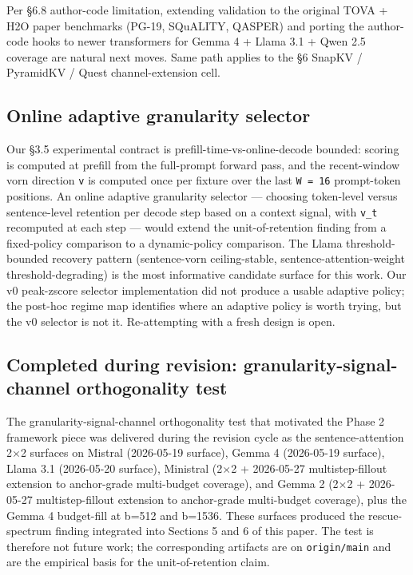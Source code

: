 \documentclass[10pt]{article}
\begin{document}
Per \S{}6.8 author-code limitation, extending validation to the original
TOVA + H2O paper benchmarks (PG-19, SQuALITY, QASPER) and porting the
author-code hooks to newer transformers for Gemma 4 + Llama 3.1 + Qwen
2.5 coverage are natural next moves. Same path applies to the \S{}6
SnapKV / PyramidKV / Quest channel-extension cell.

\subsection{Online adaptive granularity selector}\label{84-online-adaptive-granularity-selector}

Our \S{}3.5 experimental contract is prefill-time-vs-online-decode bounded:
scoring is computed at prefill from the full-prompt forward pass, and
the recent-window vorn direction \texttt{v} is computed once per fixture
over the last \texttt{W\ =\ 16} prompt-token positions. An online
adaptive granularity selector --- choosing token-level versus
sentence-level retention per decode step based on a context signal, with
\texttt{v\_t} recomputed at each step --- would extend the
unit-of-retention finding from a fixed-policy comparison to a
dynamic-policy comparison. The Llama threshold-bounded recovery pattern
(sentence-vorn ceiling-stable, sentence-attention-weight
threshold-degrading) is the most informative candidate surface for this
work. Our v0 peak-zscore selector implementation did not produce a
usable adaptive policy; the post-hoc regime map identifies where an
adaptive policy is worth trying, but the v0 selector is not it.
Re-attempting with a fresh design is open.

\subsection{Completed during revision: granularity-signal-channel orthogonality test}\label{85-completed-during-revision-granularity-signal-channel-orthogonality-test}

The granularity-signal-channel orthogonality test that motivated the
Phase 2 framework piece was delivered during the revision cycle as the
sentence-attention 2$\times$2 surfaces on Mistral (2026-05-19 surface), Gemma 4
(2026-05-19 surface), Llama 3.1 (2026-05-20 surface), Ministral
(2$\times$2 + 2026-05-27 multistep-fillout extension to anchor-grade
multi-budget coverage), and Gemma 2 (2$\times$2 + 2026-05-27
multistep-fillout extension to anchor-grade multi-budget coverage),
plus the Gemma 4 budget-fill at b=512 and b=1536. These surfaces
produced the rescue-spectrum finding integrated into Sections 5 and 6 of
this paper. The test is therefore not future work; the corresponding
artifacts are on \texttt{origin/main} and are the empirical basis for
the unit-of-retention claim.
\end{document}
